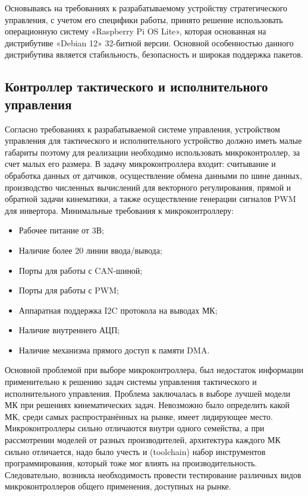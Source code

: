     Основываясь на требованиях к разрабатываемому устройству стратегического управления, с учетом его специфики работы, принято решение использовать операционную систему «Raspberry Pi OS Lite», которая основанная на дистрибутиве «Debian 12» 32-битной версии. Основной особенностью данного дистрибутива является стабильность, безопасность и широкая поддержка пакетов.

    \subsection{Контроллер тактического и исполнительного управления}

    Согласно требованиях к разрабатываемой системе управления, устройством управления для тактического и исполнительного устройство должно иметь малые габариты поэтому для реализации необходимо использовать микроконтроллер, за счет малых его размера. В задачу микроконтроллера входит: считывание и обработка данных от датчиков, осуществление обмена данными по шине данных, производство численных вычислений для векторного регулирования, прямой и обратной задачи кинематики, а также осуществление генерации сигналов PWM для инвертора. Минимальные требования к микроконтроллеру:
    \begin{itemize}
        \item Рабочее питание от 3В;
        \item Наличие более 20 линии ввода/вывода;
        \item Порты для работы с CAN-шиной;
        \item Порты для работы с PWM;
        \item Аппаратная поддержка I2C протокола на выводах МК;
        \item Наличие внутреннего АЦП;
        \item Наличие механизма прямого доступ к памяти DMA.
    \end{itemize}

    Основной проблемой при выборе микроконтроллера, был недостаток информации применительно к решению задач системы управления тактического и исполнительного управления. Проблема заключалась в выборе лучшей модели МК при решениях кинематических задач. Невозможно было определить какой МК, среди самых распространённых на рынке, имеет лидирующее место. Микроконтроллеры сильно отличаются внутри одного семейства, а при рассмотрении моделей от разных производителей, архитектура каждого МК сильно отличается, надо было учесть и (toolchain) набор инструментов программирования, который тоже мог влиять на производительность. Следовательно, возникла необходимость провести тестирование различных видов микроконтроллеров общего применения, доступных на рынке.

